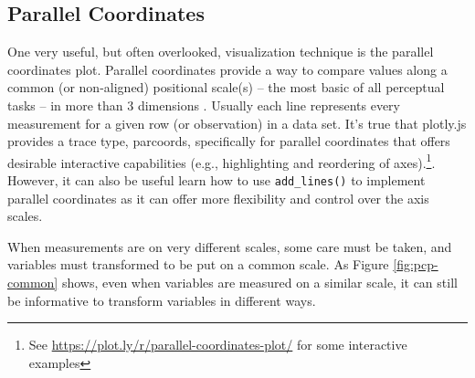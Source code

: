 \documentclass[
  12pt,
]{krantz}
\newenvironment{Shaded}{\begin{snugshade}}{\end{snugshade}}
\newcommand{\ControlFlowTok}[1]{\textcolor[rgb]{0.13,0.29,0.53}{\textbf{#1}}}
\newcommand{\DataTypeTok}[1]{\textcolor[rgb]{0.13,0.29,0.53}{#1}}
\newcommand{\DecValTok}[1]{\textcolor[rgb]{0.00,0.00,0.81}{#1}}
\newcommand{\FloatTok}[1]{\textcolor[rgb]{0.00,0.00,0.81}{#1}}
\newcommand{\KeywordTok}[1]{\textcolor[rgb]{0.13,0.29,0.53}{\textbf{#1}}}
\newcommand{\NormalTok}[1]{#1}
\newcommand{\OperatorTok}[1]{\textcolor[rgb]{0.81,0.36,0.00}{\textbf{#1}}}
\newcommand{\OtherTok}[1]{\textcolor[rgb]{0.56,0.35,0.01}{#1}}
\newcommand{\StringTok}[1]{\textcolor[rgb]{0.31,0.60,0.02}{#1}}
\begin{document}
\hypertarget{parallel-coordinates}{%
\subsection{Parallel Coordinates}\label{parallel-coordinates}}

One very useful, but often overlooked, visualization technique is the parallel coordinates plot. Parallel coordinates provide a way to compare values along a common (or non-aligned) positional scale(s) -- the most basic of all perceptual tasks -- in more than 3 dimensions \citep{graphical-perception}. Usually each line represents every measurement for a given row (or observation) in a data set. It's true that plotly.js provides a trace type, parcoords, specifically for parallel coordinates that offers desirable interactive capabilities (e.g., highlighting and reordering of axes).\footnote{See \url{https://plot.ly/r/parallel-coordinates-plot/} for some interactive examples}. However, it can also be useful learn how to use \texttt{add\_lines()} to implement parallel coordinates as it can offer more flexibility and control over the axis scales.

When measurements are on very different scales, some care must be taken, and variables must transformed to be put on a common scale. As Figure \ref{fig:pcp-common} shows, even when variables are measured on a similar scale, it can still be informative to transform variables in different ways.

\begin{Shaded}
\end{Shaded}
\end{document}
